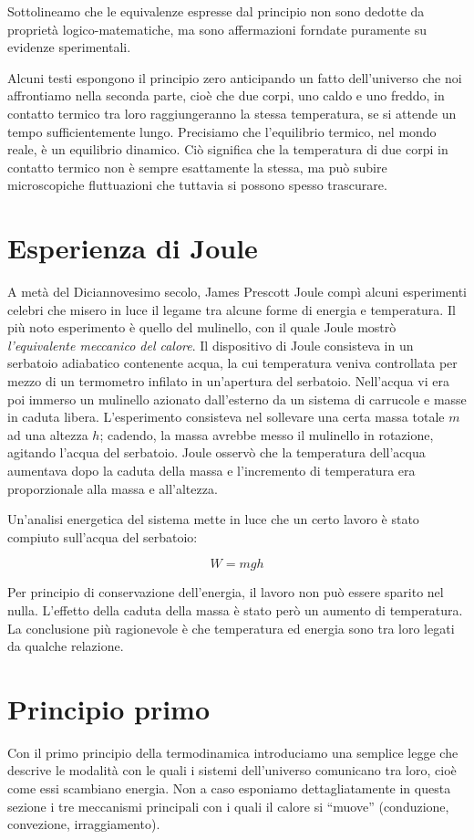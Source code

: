 \noindent Sottolineamo che le equivalenze espresse dal principio non
sono dedotte da proprietà logico-matematiche, ma sono affermazioni
forndate puramente su evidenze sperimentali.

Alcuni testi espongono il principio zero anticipando un fatto dell'universo
che noi affrontiamo nella seconda parte, cioè che due corpi, uno caldo e
uno freddo, in contatto termico tra loro raggiungeranno la stessa temperatura,
se si attende un tempo sufficientemente lungo. Precisiamo che l'equilibrio
termico, nel mondo reale, è un equilibrio dinamico. Ciò significa che
la temperatura di due corpi in contatto termico non è sempre esattamente la
stessa, ma può subire microscopiche fluttuazioni che tuttavia si possono
spesso trascurare.


\section{Esperienza di Joule}
A metà del Diciannovesimo secolo, James Prescott Joule compì alcuni
esperimenti celebri che misero in luce il legame tra alcune forme di
energia e temperatura. Il più noto esperimento è quello del mulinello,
con il quale Joule mostrò \textit{l'equivalente meccanico del calore}.
Il dispositivo di Joule consisteva in un serbatoio adiabatico contenente
acqua, la cui temperatura veniva controllata per mezzo di un termometro
infilato in un'apertura del serbatoio. Nell'acqua vi era poi immerso
un mulinello azionato dall'esterno da un sistema di carrucole e masse
in caduta libera. L'esperimento consisteva nel sollevare una certa
massa totale $m$ ad una altezza $h$; cadendo, la massa avrebbe messo
il mulinello in rotazione, agitando l'acqua del serbatoio. Joule
osservò che la temperatura dell'acqua aumentava dopo la caduta della
massa e l'incremento di temperatura era proporzionale alla massa e all'altezza.

Un'analisi energetica del sistema mette in luce che un certo lavoro è
stato compiuto sull'acqua del serbatoio:

\[ W = mgh \]

\noindent Per principio di conservazione dell'energia, il lavoro non
può essere sparito nel nulla. L'effetto della caduta della massa è stato però un aumento di temperatura.
La conclusione più ragionevole è che temperatura ed energia sono tra
loro legati da qualche relazione.




\section{Principio primo}
Con il primo principio della termodinamica introduciamo una semplice
legge che descrive le modalità con le quali i sistemi dell'universo
comunicano tra loro, cioè come essi scambiano energia. Non a caso
esponiamo dettagliatamente in questa sezione i tre meccanismi
principali con i quali il calore si ``muove'' (conduzione, convezione,
irraggiamento).


